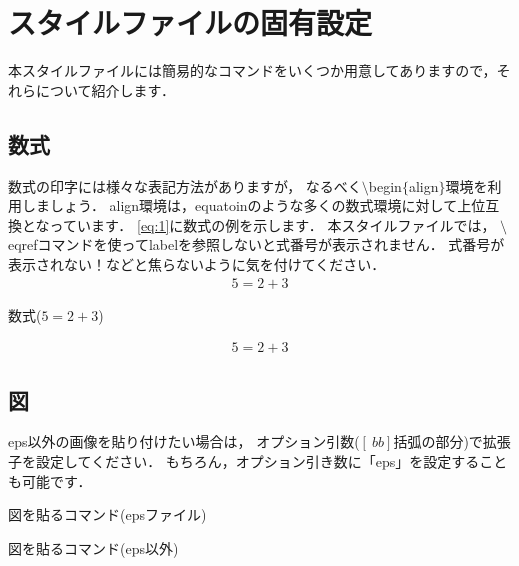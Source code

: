 \section{スタイルファイルの固有設定}
\label{sec:master}
本スタイルファイルには簡易的なコマンドをいくつか用意してありますので，それらについて紹介します．

\subsection{数式}
数式の印字には様々な表記方法がありますが，
なるべく$\setminus$begin$\{$align$\}$環境を利用しましょう．
align環境は，equatoinのような多くの数式環境に対して上位互換となっています．
\eqref{eq:1}に数式の例を示します．
本スタイルファイルでは，
$\setminus$eqrefコマンドを使ってlabelを参照しないと式番号が表示されません．
式番号が表示されない！などと焦らないように気を付けてください．
%
\begin{align}
	5 = 2 + 3
	\label{eq:1}
\end{align}
%
\begin{lstbox}{数式($5=2+3$)}
\begin{minilst}
\begin{align}
	5 = 2 + 3
	\label{eq:1}
\end{align}
\end{minilst}
\end{lstbox}

\subsection{図}
eps以外の画像を貼り付けたい場合は，
オプション引数($[\ bb]$括弧の部分)で拡張子を設定してください．
もちろん，オプション引き数に「eps」を設定することも可能です．
%
\begin{lstbox}{図を貼るコマンド(epsファイル)}
\begin{minilst}
\end{minilst}
\end{lstbox}
%
\begin{lstbox}{図を貼るコマンド(eps以外)}
\begin{minilst}
\end{minilst}
\end{lstbox}


